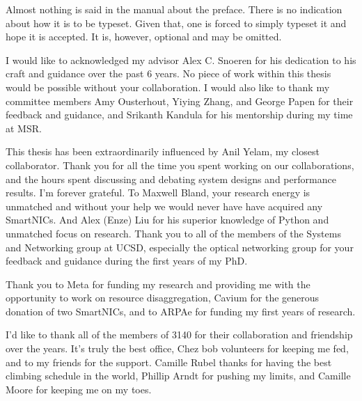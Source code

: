 \documentclass[12pt]{ucsddissertation}
\begin{document}
\tableofcontents
\listoffigures
\listoftables

\begin{preface}
Almost nothing is said in the manual about the preface. There is no
indication about how it is to be typeset. Given that, one is forced to
simply typeset it and hope it is accepted. It is, however, optional
and may be omitted.
\end{preface}

\begin{acknowledgements}

I would like to acknowledged my advisor Alex C. Snoeren for his dedication to his craft and guidance
over the past 6 years. No piece of work within this thesis would be possible without your
collaboration. I would also like to thank my committee members Amy Ousterhout, Yiying Zhang, and
George Papen for their feedback and guidance, and Srikanth Kandula for his mentorship during my time
at MSR.

This thesis has been extraordinarily influenced by Anil Yelam, my closest collaborator. Thank you
for all the time you spent working on our collaborations, and the hours spent discussing and
debating system designs and performance results. I'm forever grateful. To Maxwell Bland, your
research energy is unmatched and without your help we would never have have acquired any SmartNICs.
And Alex (Enze) Liu for his superior knowledge of Python and unmatched focus on research.  Thank you
to all of the members of the Systems and Networking group at UCSD, especially the optical networking
group for your feedback and guidance during the first years of my PhD.

Thank you to Meta for funding my research and providing me with the opportunity to work on resource
disaggregation, Cavium for the generous donation of two SmartNICs, and to ARPAe for funding my first
years of research.

I'd like to thank all of the members of 3140 for their collaboration and friendship over the years.
It's truly the best office, Chez bob volunteers for keeping me fed, and to my friends for the
support. Camille Rubel thanks for having the best climbing schedule in the world, Phillip Arndt for
pushing my limits, and Camille Moore for keeping me on my toes.


\end{acknowledgements}
\end{document}
